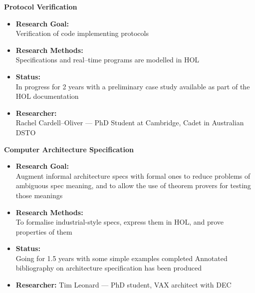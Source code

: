 \begin{center}{\bf Protocol Verification}\end{center}
\begin{itemize}
\item {\bf Research Goal:} $\;$ \\
Verification of code implementing protocols
\item {\bf Research Methods:} $\;$ \\
Specifications and real--time programs are modelled in {\small HOL}
\item {\bf Status:}$\;$ \\
In progress for 2 years with a preliminary case study available as part of 
the {\small HOL} documentation
\item {\bf Researcher:} $\;$ \\
Rachel Cardell--Oliver --- PhD Student at Cambridge, 
Cadet in Australian {\small DSTO}
\end{itemize}

\begin{center}{\bf Computer Architecture Specification}\end{center}
\begin{itemize}
\item {\bf Research Goal:} $\;$ \\
Augment informal architecture specs with formal ones
to reduce problems of ambiguous spec meaning, and to allow the use of theorem
provers for testing those meanings
\item {\bf Research Methods:} $\;$ \\
To formalise industrial-style specs, express them
in {\small HOL}, and prove properties of them
\item {\bf Status:}$\;$ \\
Going for 1.5 years with some simple examples completed  Annotated 
bibliography on architecture specification has been produced
\item {\bf Researcher:} Tim Leonard --- PhD student, {\small VAX}
architect with {\small DEC} 
\end{itemize}


